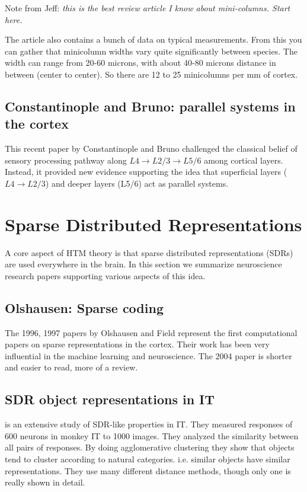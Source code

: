 \documentclass{article} %
\begin{document}
\cite{Buxhoeveden2002} Note from Jeff: \emph{this is the best review article I
know about mini-columns. Start here.}

The article also contains a bunch of data on typical measurements. From this you
can gather that minicolumn widths vary quite significantly between species.  The
width can range from 20-60 microns, with about 40-80 microns distance in between
(center to center).  So there are 12 to 25 minicolumns per mm of cortex.

\subsection{Constantinople and Bruno: parallel systems in the cortex}
This recent paper by Constantinople and Bruno \cite{Constantinople2013}
challenged the  classical belief of sensory processing pathway along
$L4\rightarrow L2/3 \rightarrow L5/6$ among cortical layers.  Instead, it
provided new evidence supporting the idea that superficial layers
($L4\rightarrow L2/3$) and  deeper layers (L5/6) act as parallel systems.

\section{Sparse Distributed Representations}

A core aspect of HTM theory is that sparse distributed representations (SDRs)
are used everywhere in the brain. In this section we summarize neuroscience
research papers supporting various aspects of this idea.

\subsection{Olshausen: Sparse coding}

The 1996, 1997 papers \cite{Olshausen1996, Olshausen1997} by Olshausen and Field represent the first computational papers on
sparse representations in the cortex. Their work has been very influential in
the machine learning and neuroscience. The 2004 paper \cite{Olshausen2004} is
shorter and easier to read, more of a review.

\subsection{SDR object representations in IT}

\cite{Kiani2007} is an extensive study of SDR-like properties in IT. They
measured responses of 600 neurons in monkey IT to 1000 images. They analyzed the
similarity between all pairs of responses. By doing agglomerative clustering
they show that objects tend to cluster according to natural categories. i.e.
similar objects have similar representations. They use many different distance
methods, though only one is really shown in detail.
\end{document}
